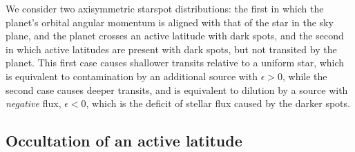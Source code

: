 We consider two axisymmetric starspot distributions: the first in which the planet's orbital angular momentum is aligned with that of the star in the sky plane, and the planet crosses an active latitude with dark spots, and the second in which active latitudes are present with dark spots, but not transited by the planet.  This first case causes shallower transits relative to a uniform star, which is equivalent to contamination by an additional source with $\epsilon > 0$, while the second case causes deeper transits, and is equivalent to dilution by a source with {\it negative} flux, $\epsilon < 0$, which is the deficit of stellar flux caused by the darker spots.

\subsection{Occultation of an active latitude} \label{sec:activelat}

